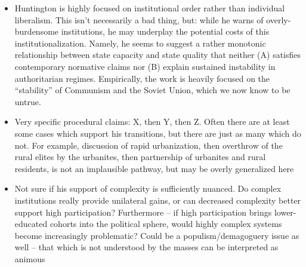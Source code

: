 \documentclass[12pt]{article}
\begin{document}
\begin{itemize}
    \item Huntington is highly focused on institutional order rather than individual liberalism. This isn't necessarily a bad thing, but: while he warns of overly-burdensome institutions, he may underplay the potential costs of this institutionalization. Namely, he seems to suggest a rather monotonic relationship between state capacity and state quality that neither (A) satisfies contemporary normative claims nor (B) explain sustained instability in authoritarian regimes. Empirically, the work is heavily focused on the ``stability'' of Communism and the Soviet Union, which we now know to be untrue.
    \item Very specific procedural claims: X, then Y, then Z. Often there are at least some cases which support his transitions, but there are just as many which do not. For example, discussion of rapid urbanization, then overthrow of the rural elites by the urbanites, then partnership of urbanites and rural residents, is not an implausible pathway, but may be overly generalized here
    \item Not sure if his support of complexity is sufficiently nuanced. Do complex institutions really provide unilateral gains, or can decreased complexity better support high participation? Furthermore -- if high participation brings lower-educated cohorts into the political sphere, would highly complex systems become increasingly problematic? Could be a populism/demagoguery issue as well -- that which is not understood by the masses can be interpreted as animous
\end{itemize}
\end{document}
